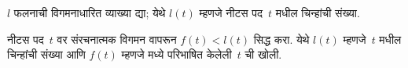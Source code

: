 \documentclass[../../../include/open-logic-section]{subfiles}
\begin{document}
\begin{prob}
$l$ फलनाची विगमनाधारित व्याख्या द्या; येथे $l(t)$ म्हणजे नीटस पद~$t$ मधील चिन्हांची संख्या.
\end{prob}

\begin{prob}
नीटस पद~$t$ वर संरचनात्मक विगमन वापरून $f(t) < l(t)$ सिद्ध करा. येथे $l(t)$ म्हणजे~$t$ मधील चिन्हांची संख्या आणि $f(t)$ म्हणजे  मध्ये परिभाषित केलेली~$t$ ची खोली.
\end{prob}
\end{document}
